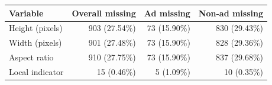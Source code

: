 \begin{tabular}{lrrr}
\toprule
Variable & Overall missing & Ad missing & Non-ad missing
\\
\midrule
Height (pixels) & 903 (27.54\%) & 73 (15.90\%) & 830 (29.43\%)
\\
Width (pixels) & 901 (27.48\%) & 73 (15.90\%) & 828 (29.36\%)
\\
Aspect ratio & 910 (27.75\%) & 73 (15.90\%) & 837 (29.68\%)
\\
Local indicator & 15 (0.46\%) & 5 (1.09\%) & 10 (0.35\%)
\\
\bottomrule
\end{tabular}
